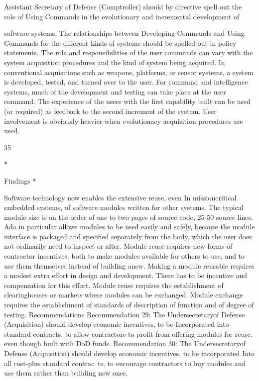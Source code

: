 \documentclass[12pt]{article}
\begin{document}
Assistant Secretary of Defense (Comptroller) should by directive spell out the
role of Using Commands in the evolutionary and incremental development of

software systems.
The relationships between Developing Commands and Using Commands for the
different kinds of systems should be spelled out in policy statements. The role and
responsibilities of the user commands can vary with the system acquisition procedures
and the kind of system being acquired. In conventional acquisitions such as weapons,
platforms, or sensor systems, a system is developed, tested, and turned over to the user.
For command and intelligence systems, much of the development and testing can take
place at the user command. The experience of the users with the first capability built can
be used (or required) as feedback to the second increment of the system. User involvement
is obviously heavier when evolutionacy acquisition procedures are used.

35

*

Findings
*

Software technology now enables the extensive reuse, even In missioncritical embedded systems, of software modules written for other systems.
The typical module size is on the order of one to two pages of source code, 25-50
source lines. Ada in particular allows modules to be used easily and safely, because the
module interface is packaged and specified separately from the body, which the user does
not ordinarily need to inspect or alter.
Module reuse requires new forms of contractor incentives, both to make
modules available for others to use, and to use them themselves instead of
building anew. Making a module reusable requires a modest extra effort in design and
development. There has to be incentive and compensation for this effort.
Module reuse requires the establishment of clearinghouses or markets where
modules can be exchanged.
Module exchange requires the establishment of standards of description of
function and of degree of testing.
Recommendations
Recommendation 29: The Undersecretaryof Defense (Acquisition) should
develop economic incentives, to be Incorporated into standard contracts, to
allow contractors to profit from offering modules for reuse, even though built
with DoD funds.
Recommendation 30: The Undersecretaryof Defense (Acquisition) should
develop economic incentives, to be incorporated Into all cost-plus standard
contrac~ts, to encourage contractors to buy modules and use them rather than
building new ones.
\end{document}
